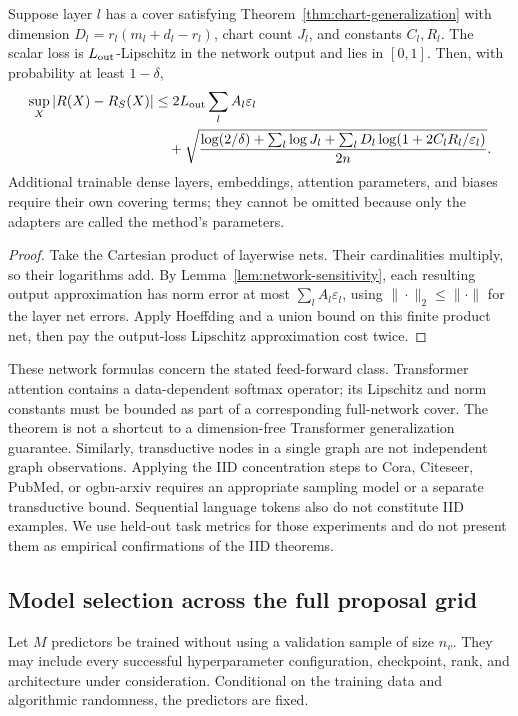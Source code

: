 \begin{theorem}
\label{thm:network-generalization}
Suppose layer $l$ has a cover satisfying Theorem~\ref{thm:chart-generalization}
with dimension $D_l=r_l(m_l+d_l-r_l)$, chart count $J_l$, and constants
$C_l,R_l$. The scalar loss is $L_{\rm out}$-Lipschitz in the network
output and lies in $[0,1]$. Then, with probability at least $1-\delta$,
\begin{align}
 \sup_X|R(X)-R_S(X)|
 &\leq2L_{\rm out}\sum_l A_l\varepsilon_l\notag\\
 &\quad+\sqrt{\frac{\log(2/\delta)+\sum_l\log J_l+
 \sum_lD_l\log(1+2C_lR_l/\varepsilon_l)}{2n}}.
 \label{eq:network-generalization}
\end{align}
Additional trainable dense layers, embeddings, attention parameters, and
biases require their own covering terms; they cannot be omitted because
only the adapters are called the method's parameters.
\end{theorem}
\begin{proof}
Take the Cartesian product of layerwise nets. Their cardinalities
multiply, so their logarithms add. By Lemma~\ref{lem:network-sensitivity},
each resulting output approximation has norm error at most
$\sum_l A_l\varepsilon_l$, using $\|\cdot\|_2\leq\|\cdot\|$ for the
layer net errors. Apply Hoeffding and a union bound on this finite product
net, then pay the output-loss Lipschitz approximation cost twice.
\end{proof}

These network formulas concern the stated feed-forward class. Transformer
attention contains a data-dependent softmax operator; its Lipschitz and
norm constants must be bounded as part of a corresponding full-network
cover. The theorem is not a shortcut to a dimension-free Transformer
generalization guarantee. Similarly, transductive nodes in a single graph
are not independent graph observations. Applying the IID concentration
steps to Cora, Citeseer, PubMed, or ogbn-arxiv requires an appropriate
sampling model or a separate transductive bound. Sequential language tokens
also do not constitute IID examples. We use held-out task metrics for
those experiments and do not present them as empirical confirmations of
the IID theorems.

\subsection{Model selection across the full proposal grid}
Let $M$ predictors be trained without using a validation sample of size
$n_v$. They may include every successful hyperparameter configuration,
checkpoint, rank, and architecture under consideration. Conditional on the
training data and algorithmic randomness, the predictors are fixed.

